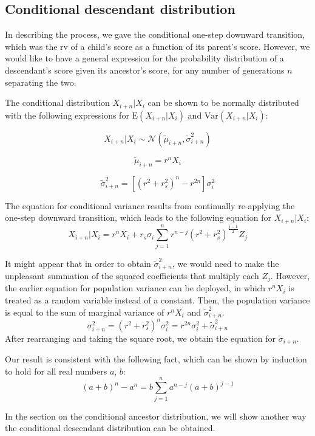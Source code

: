\documentclass[a4paper,11pt]{article} %
\begin{document}
\subsection{Conditional descendant distribution}

In describing the process, we gave the conditional one-step downward transition, which was the rv of a child's score as a function of its parent's score. However, we would like to have a general expression for the probability distribution of  a descendant's score given its ancestor's score, for any number of generations $n$ separating the two. 

The conditional distribution $X_{i+n}|X_i$ can be shown to be normally distributed with the following expressions for $\mathrm{E}(X_{i+n}|X_i)$ and $\mathrm{Var}(X_{i+n}|X_i)$:

$$X_{i+n}|X_i \sim \mathcal{N}( \tilde{\mu}_{i+n}, \tilde{\sigma}_{i+n}^2)$$

$$\tilde{\mu}_{i+n} = r^nX_i$$

$$\tilde{\sigma}_{i+n}^2 = [(r^2+r_s^2)^n-r^{2n}] \sigma_i^2$$

The equation for conditional variance results from continually re-applying the one-step downward transition, which leads to the following equation for $X_{i+n}|X_i$:
$$X_{i+n}|X_i = r^nX_i + r_s\sigma_i \sum_{j=1}^{n}r^{n-j}(r^2+r_s^2)^{\frac{j-1}{2}}Z_j$$

It might appear that in order to obtain $\tilde{\sigma}_{i+n}^2$, we would need to make the unpleasant summation of the squared coefficients that multiply each $Z_j$. However, the earlier equation for population variance can be deployed, in which $r^nX_i$ is treated as a random variable instead of a constant. Then, the population variance is equal to the sum of marginal variance of $r^nX_i$ and $\tilde{\sigma}_{i+n}^2$.
%
$$\sigma_{i+n}^2 =  (r^2+r_s^2)^n  \sigma_{i}^2 =  r^{2n}\sigma_i^2 + \tilde{\sigma}_{i+n}^2$$
%
After rearranging and taking the square root, we obtain the equation for $\tilde{\sigma}_{i+n}$.

Our result is consistent with the following fact, which can be shown by induction to hold for all real numbers $a$,  $b$:
$$(a+b)^n - a^n = b \sum_{j=1}^{n}a^{n-j}(a+b)^{j-1}$$

In the section on the conditional ancestor distribution, we will show another way the conditional descendant distribution can be obtained.




\end{document}
